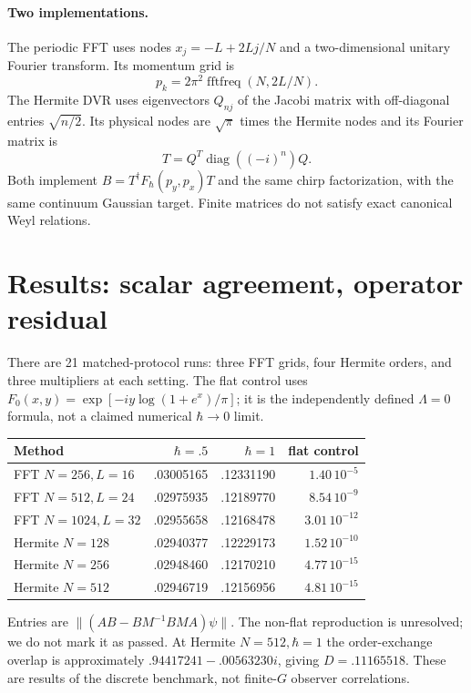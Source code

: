 \documentclass[11pt,a4paper]{article}
\newcommand{\F}{F_\hbar}
\begin{document}
\paragraph{Two implementations.}
The periodic FFT uses nodes $x_j=-L+2Lj/N$ and a two-dimensional
unitary Fourier transform. Its momentum grid is
\[
p_k=2\pi^2\operatorname{fftfreq}(N,2L/N).
\]
The Hermite DVR uses eigenvectors $Q_{nj}$
of the Jacobi matrix with off-diagonal entries $\sqrt{n/2}$.
Its physical nodes are $\sqrt{\pi}$ times the Hermite nodes and
its Fourier matrix is
\begin{equation}
 T=Q^T\operatorname{diag}((-i)^n)Q .
\end{equation}
Both implement $B=T^\dagger\F(p_y,p_x)T$ and the same chirp
factorization, with the same continuum Gaussian target.
Finite matrices do not satisfy exact canonical Weyl relations.
\newpage

\section{Results: scalar agreement, operator residual}
There are 21 matched-protocol runs: three FFT grids, four Hermite
orders, and three multipliers at each setting. The flat control uses
$F_0(x,y)=\exp[-iy\log(1+e^x)/\pi]$; it is the independently defined
$\Lambda=0$ formula, not a claimed numerical $\hbar\to0$ limit.
\begin{center}
\begin{tabular}{lrrr}
\toprule
Method & $\hbar=.5$ & $\hbar=1$ & flat control\\
\midrule
FFT $N=256,L=16$ & .03005165 & .12331190 & $1.40\,10^{-5}$\\
FFT $N=512,L=24$ & .02975935 & .12189770 & $8.54\,10^{-9}$\\
FFT $N=1024,L=32$ & .02955658 & .12168478 & $3.01\,10^{-12}$\\
Hermite $N=128$ & .02940377 & .12229173 & $1.52\,10^{-10}$\\
Hermite $N=256$ & .02948460 & .12170210 & $4.77\,10^{-15}$\\
Hermite $N=512$ & .02946719 & .12156956 & $4.81\,10^{-15}$\\
\bottomrule
\end{tabular}
\end{center}
Entries are $\|(AB-BM^{-1}BMA)\psi\|$. The non-flat reproduction
is unresolved; we do not mark it as passed.
At Hermite $N=512,\hbar=1$ the order-exchange overlap is approximately
$.94417241-.00563230i$, giving $D=.11165518$.
These are results of the discrete benchmark, not finite-$G$
observer correlations.
\end{document}

